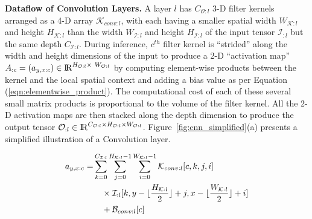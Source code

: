 \vspace{2mm}
\noindent \textbf{Dataflow of Convolution Layers.}
A layer $l$ has $C_{\mathcal{O}:l}$ 3-D filter kernels arranged as a 4-D array $\mathcal{K}_{conv:l}$, with each having a smaller spatial width $W_{\mathcal{K}:l}$ and height $H_{\mathcal{K}:l}$ than the width $W_{\mathcal{I}:l}$ and height $H_{\mathcal{I}:l}$ of the input tensor $\mathcal{I}_{:l}$ but the same depth $C_{\mathcal{I}:l}$. During inference, $c^{th}$ filter kernel is ``strided'' along the width and height dimensions of the input to produce a 2-D ``activation map'' $A_{:c}=(a_{y,x:c})\in \mathcal{\rm I\!R}^{H_{\mathcal{O}:l} \times~ W_{\mathcal{O}:l}}$ by computing element-wise products between the kernel and the local spatial context and adding a bias value as per Equation (\ref{eqn:elementwise_product}). The computational cost of each of these several small matrix products is proportional to the volume of the filter kernel. All the 2-D activation maps are then stacked along the depth dimension to produce the output tensor $\mathcal{O}_{:l} \in \mathcal{\rm I\!R}^{C_{\mathcal{O}:l} \times H_{\mathcal{O}:l} \times W_{\mathcal{O}:l}}$.
Figure~\ref{fig:cnn_simplified}(a) presents a simplified illustration of a Convolution layer.


\begin{align}
\label{eqn:elementwise_product}
\begin{split}
a_{y,x:c} =& \sum_{k=0}^{C_{\mathcal{I}:l} } \sum_{j=0}^{H_{\mathcal{K}:l}-1} \sum_{i=0}^{W_{\mathcal{K}:l}-1} \mathcal{K}_{conv:l}[c, k, j, i] \\
& \quad \times \mathcal{I}_{:l}[k,y-\lfloor\frac{H_{\mathcal{K}:l} }{2}\rfloor+j,x-\lfloor\frac{W_{\mathcal{K}:l} }{2}\rfloor+i] \\
& \quad + \mathcal{B}_{conv:l}[c]
\end{split}
\end{align}



